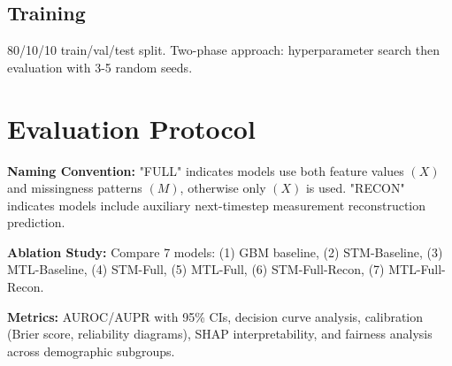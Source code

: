 \documentclass[11pt, a4paper]{article}
\begin{document}
\subsection{Training}
80/10/10 train/val/test split. Two-phase approach: hyperparameter search then evaluation with 3-5 random seeds.

\section{Evaluation Protocol}
\textbf{Naming Convention:} "FULL" indicates models use both feature values $(X)$ and missingness patterns $(M)$, otherwise only $(X)$ is used. "RECON" indicates models include auxiliary next-timestep measurement reconstruction prediction.

\textbf{Ablation Study:} Compare 7 models: (1) GBM baseline, (2) STM-Baseline, (3) MTL-Baseline, (4) STM-Full, (5) MTL-Full, (6) STM-Full-Recon, (7) MTL-Full-Recon.

\textbf{Metrics:} AUROC/AUPR with 95\% CIs, decision curve analysis, calibration (Brier score, reliability diagrams), SHAP interpretability, and fairness analysis across demographic subgroups.
\end{document}
